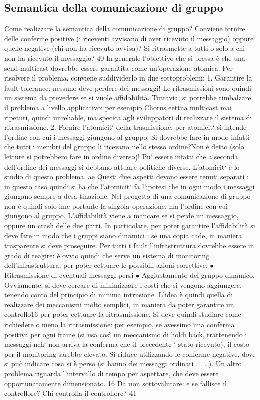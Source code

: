 \subsection{Semantica della comunicazione di gruppo}
Come realizzare la semantica della comunicazione di gruppo? Conviene fornire
delle conferme positive (i riceventi avvisano di aver ricevuto il messaggio) oppure
quelle negative (chi non ha ricevuto avvisa)? Si ritrasmette a tutti o solo a chi
non ha ricevuto il messaggio?
40
In generale l'obiettivo che si pressa è che una send multicast dovrebbe
essere garantita come un'operazione atomica. Per risolvere il problema, conviene
suddividerlo in due sottoproblemi:
1. Garantire la fault tolerance: nessuno deve perdere dei messaggi! Le ritrasmissioni sono quindi un sistema da
prevedere se si vuole affidabilità.
Tuttavia, si potrebbe rimbalzare il problema a livello applicativo: per
esempio Chorus eettua multicast mai ripetuti, quindi unreliable, ma
specica agli sviluppatori di realizzare il sistema di ritrasmissione.
2. Fornire l'atomicit` della trasmissione: per atomicit` si intende l'ordine
con cui i messaggi giungono al gruppo. Si dovrebbe fare in modo infatti
che tutti i membri del gruppo li ricevano nello stesso ordine?Non è detto
(solo letture si potrebbero fare in ordine diverso)! Pu` essere infatti che
a seconda dell'ordine dei messaggi si debbano attuare politiche diverse.
L'atomicit` è lo studio di questo problema.
ae
Questi due aspetti devono essere tenuti separati : in questo caso quindi si ha
che l'atomicit` fa l'ipotesi che in ogni modo i messaggi giungano sempre a desa
tinazione. Nel progetto di una comunicazione di gruppo non è quindi solo ime
portante la singola operazione, ma l'ordine con cui giungono al gruppo.
L'affidabilità viene a mancare se si perde un messaggio, oppure un crash
delle due parti. In particolare, per poter garantire l'affidabilità si deve fare in
modo che i gruppi siano dinamici : se una copia cade, in maniera trasparente
si deve proseguire. Per tutti i fault l'infrastruttura dovrebbe essere in grado di
reagire: è ovvio quindi che serve un sistema di monitoring dell'infrastruttura,
per poter eettuare le possibili azioni correttive:
$\bullet$ Ritrasmissione di eventuali messaggi persi
$\bullet$ Aggiustamento del gruppo dinamico.
Ovviamente, si deve cercare di minimizzare i costi che si vengono aggiungere,
tenendo conto del principio di minima intrusione.
L'idea è quindi quella di realizzare dei meccanismi molto semplici, in maniera
da poter garantire un controllo16 per poter eettuare la ritrasmissione. Si deve
quindi studiare come richiedere o meno la ritrasmissione: per esempio, se avessimo una conferma positiva per ogni frame
(si usa così un meccanismo di hold\i{}
back, trattenendo i messaggi nch` non arriva la conferma che il precedente `
stato ricevuto), il costo per il monitoring sarebbe elevato. Si riduce utilizzando
le conferme negative, dove si può indicare cosa si è perso (si hanno dei messaggi
ordinati . . . ). Un altro problema riguarda l'intervallo di tempo per aspettare,
che deve essere opportunatamente dimensionato.
16 Da
non sottovalutare: e se fallisce il controllore? Chi controlla il controllore?
41
